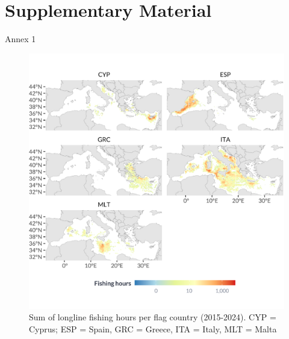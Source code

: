 \chapter{Supplementary Material}

Annex 1

 \begin{figure}[H]
    \centering
    \includegraphics[width=1\linewidth, trim=0 1.2cm 0 1.2cm,clip]{Figures/plots/longline_countries.pdf}
    \caption{Sum of longline fishing hours per flag country (2015-2024). CYP = Cyprus; ESP = Spain, GRC = Greece, ITA = Italy, MLT = Malta}
    \label{fig:longline_effort_countries}
\end{figure}

